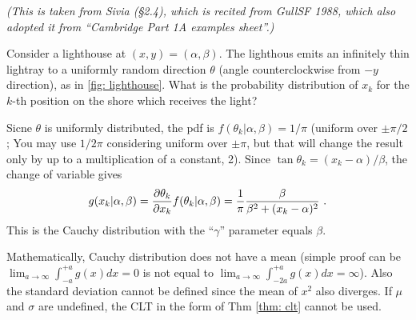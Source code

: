 \begin{ex}\label{ex: lighthouse}
\textit{(This is taken from Sivia (\S 2.4), which is recited from GullSF 1988, which also adopted it from ``Cambridge Part 1A examples sheet''.)}

Consider a lighthouse at $ (x, y) = (\alpha, \beta) $. The lighthous emits an infinitely thin lightray to a uniformly random direction $ \theta $ (angle counterclockwise from $ -y $ direction), as in \cref{fig: lighthouse}. What is the probability distribution of $ x_k $ for the $ k $-th position on the shore which receives the light?

Sicne $ \theta $ is uniformly distributed, the pdf is $ f(\theta_k | \alpha, \beta) = 1/\pi $ (uniform over $ \pm \pi/2 $; You may use $ 1/2\pi $ considering uniform over $ \pm \pi $, but that will change the result only by up to a multiplication of a constant, 2). Since $ \tan \theta_k = (x_k - \alpha)/\beta $, the change of variable gives
\begin{equation*}
  g(x_k | \alpha, \beta) = \pdv{\theta_k}{x_k} f(\theta_k | \alpha, \beta)
    = \frac{1}{\pi} \frac{\beta}{\beta^2 + (x_k - \alpha)^2} ~.
\end{equation*}
This is the Cauchy distribution with the ``$ \gamma $'' parameter equals $ \beta $. 

Mathematically, Cauchy distribution does not have a mean (simple proof can be $ \lim_{a\rightarrow \infty} \int_{-a}^{+a} g(x) dx = 0$ is not equal to $ \lim_{a\rightarrow \infty} \int_{-2a}^{+a} g(x) dx = \infty $). Also the standard deviation cannot be defined since the mean of $ x^2 $ also diverges. If $ \mu $ and $ \sigma $ are undefined, the CLT in the form of Thm \ref{thm: clt} cannot be used.
\end{ex}



